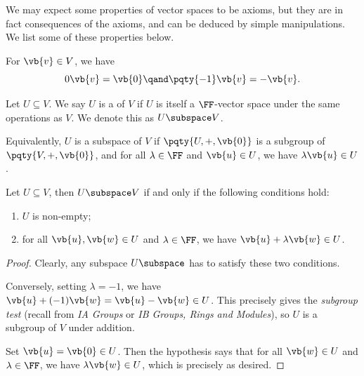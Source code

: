 We may expect some properties of vector spaces to be axioms, but they are in fact consequences of the axioms, and can be deduced by simple manipulations. We list some of these properties below.

\begin{proposition}
    For \(\vb{v} \in V\), we have
    \[
        0 \vb{v} = \vb{0} \qand \pqty{-1} \vb{v} = -\vb{v}.
    \]
\end{proposition}

\begin{definition}[Subspace]
    Let \(U \subseteq V\). We say \(U\) is a  of \(V\) if \(U\) is itself a \(\FF\)-vector space under the same operations as \(V\). We denote this as \(U \subspace V\).

    Equivalently, \(U\) is a subspace of \(V\) if \(\pqty{U, +, \vb{0}}\) is a subgroup of \(\pqty{V, +, \vb{0}}\), and for all \(\lambda \in \FF\) and \(\vb{u} \in U\), we have \(\lambda \vb{u} \in U\).
\end{definition}

\begin{proposition}
    Let \(U \subseteq V\), then \(U \subspace V\) if and only if the following conditions hold:
    \begin{enumerate}[label=(\alph*)]
        \item \(U\) is non-empty;
        \item for all \(\vb{u}, \vb{w} \in U\) and \(\lambda \in \FF\), we have \(\vb{u} + \lambda \vb{w} \in U\).
    \end{enumerate}
\end{proposition}

\begin{proof}
    Clearly, any subspace \(U \subspace\) has to satisfy these two conditions.

    Conversely, setting \(\lambda = -1\), we have \(\vb{u} + (-1) \vb{w} = \vb{u} - \vb{w} \in U\). This precisely gives the \emph{subgroup test} (recall from \textit{IA Groups} or \textit{IB Groups, Rings and Modules}), so \(U\) is a subgroup of \(V\) under addition.

    Set \(\vb{u} = \vb{0} \in U\). Then the hypothesis says that for all \(\vb{w} \in U\) and \(\lambda \in \FF\), we have \(\lambda \vb{w} \in U\), which is precisely as desired.
\end{proof}

